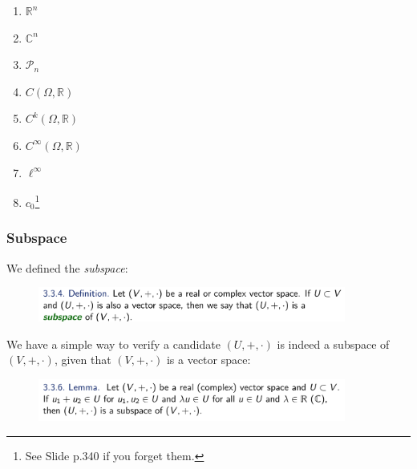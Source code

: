 \documentclass[10pt, t]{beamer}
\renewcommand{\emph}[1]{{\color{themecolor}\textsl{#1}}}
\newcommand{\R}{\mathbb{R}}
\begin{document}
\begin{frame}[allowframebreaks]
\begin{itemize}
\begin{enumerate}
            \item $\R^n$
            \item $\mathbb{C}^n$
            \item $\mathcal{P}_n$
            \item $C(\Omega , \R)$
            \item $C^k(\Omega , \R)$
            \item $C^\infty(\Omega , \R)$
            \item $\ell^\infty$
            \item $c_0$\footnote[frame]{See Slide p.340 if you forget them.}
        \end{enumerate}
    \end{itemize}
\end{frame}

\begin{frame}
    \frametitle{Subspace}

    We defined the \emph{subspace}:
    \begin{figure}[H]
        \centering
        \includegraphics[width=0.9\textwidth]{2020-11-17-20-03-23.png}
    \end{figure}

    We have a simple way to verify a candidate $(U,+,\cdot)$ is indeed a subspace of $(V,+,\cdot)$, given that $(V,+,\cdot)$ is a vector space:
    \begin{figure}[H]
        \centering
        \includegraphics[width=0.9\textwidth]{2020-11-17-20-07-20.png}
    \end{figure}
\end{frame}
\end{document}
